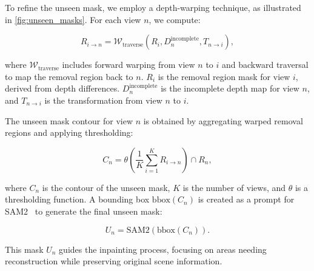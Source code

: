 
\vspace{3pt}
To refine the unseen mask, we employ a depth-warping technique, as illustrated in \cref{fig:unseen_masks}. For each view $n$, we compute:
\begin{small}
\begin{equation}
R_{i \rightarrow n} = \mathcal{W}_{\text{traverse}}(R_{i}, D_n^{\text{incomplete}}, T_{n \rightarrow i}),
\end{equation}
\end{small}
where $\mathcal{W}_{\text{traverse}}$ includes forward warping from view $n$ to $i$ and backward traversal to map the removal region back to $n$. $R_i$ is the removal region mask for view $i$, derived from depth differences. $D_{n}^{\text{incomplete}}$ is the incomplete depth map for view $n$, and $T_{n \rightarrow i}$ is the transformation from view $n$ to $i$.  

The unseen mask contour for view $n$ is obtained by aggregating warped removal regions and applying thresholding:
\begin{small}
\begin{equation}
C_n = \theta \left( \frac{1}{K} \sum_{i=1}^K R_{i \rightarrow n} \right) \cap R_{n},
\end{equation}
\end{small}
where $C_n$ is the contour of the unseen mask, $K$ is the number of views, and $\theta$ is a thresholding function. A bounding box $\text{bbox}(C_n)$ is created as a prompt for SAM2~\cite{ravi2024sam2} to generate the final unseen mask:
\begin{small}
\begin{equation}
U_n = \text{SAM2}(\text{bbox}(C_n)).
\end{equation}
\end{small}
This mask $U_n$ guides the inpainting process, focusing on areas needing reconstruction while preserving original scene information.


